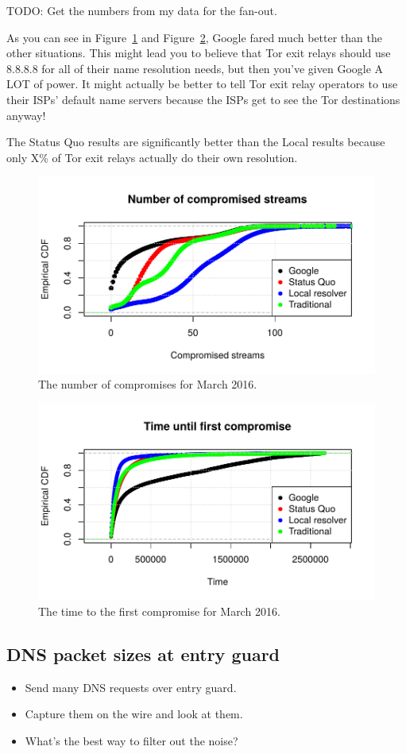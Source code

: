 TODO: Get the numbers from my data for the fan-out.

As you can see in Figure~\ref{fig:num-compromises} and Figure~\ref{fig:time-to-first-comp}, 
Google fared much better than the other situations. This might lead you to believe that 
Tor exit relays should use 8.8.8.8 for all of their name resolution needs, but then you've 
given Google A LOT of power. It might actually be better to tell Tor exit relay operators 
to use their ISPs' default name servers because the ISPs get to see the Tor destinations 
anyway!

The Status Quo results are significantly better than the Local results because only X\% 
of Tor exit relays actually do their own resolution.

\begin{figure}[t]
	\centering
	\includegraphics[width=0.75\linewidth]{figures/num-compromised-streams.pdf}
	\caption{The number of compromises for March 2016.}
	\label{fig:num-compromises}
\end{figure}

\begin{figure}[t]
	\centering
	\includegraphics[width=0.75\linewidth]{figures/time-until-compromised.pdf}
	\caption{The time to the first compromise for March 2016.}
	\label{fig:time-to-first-comp}
\end{figure}


\subsection{DNS packet sizes at entry guard}
\begin{itemize}
	\item Send many DNS requests over entry guard.
	\item Capture them on the wire and look at them.
	\item What's the best way to filter out the noise?
\end{itemize}

